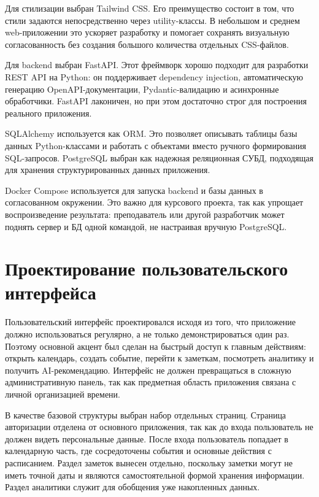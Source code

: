 \documentclass[14pt,a4paper]{extreport}
\begin{document}
Для стилизации выбран Tailwind CSS. Его преимущество состоит в том, что стили задаются непосредственно через utility-классы. В небольшом и среднем web-приложении это ускоряет разработку и помогает сохранять визуальную согласованность без создания большого количества отдельных CSS-файлов.

Для backend выбран FastAPI. Этот фреймворк хорошо подходит для разработки REST API на Python: он поддерживает dependency injection, автоматическую генерацию OpenAPI-документации, Pydantic-валидацию и асинхронные обработчики. FastAPI лаконичен, но при этом достаточно строг для построения реального приложения.

SQLAlchemy используется как ORM. Это позволяет описывать таблицы базы данных Python-классами и работать с объектами вместо ручного формирования SQL-запросов. PostgreSQL выбран как надежная реляционная СУБД, подходящая для хранения структурированных данных приложения.

Docker Compose используется для запуска backend и базы данных в согласованном окружении. Это важно для курсового проекта, так как упрощает воспроизведение результата: преподаватель или другой разработчик может поднять сервер и БД одной командой, не настраивая вручную PostgreSQL.

\section{Проектирование пользовательского интерфейса}

Пользовательский интерфейс проектировался исходя из того, что приложение должно использоваться регулярно, а не только демонстрироваться один раз. Поэтому основной акцент был сделан на быстрый доступ к главным действиям: открыть календарь, создать событие, перейти к заметкам, посмотреть аналитику и получить AI-рекомендацию. Интерфейс не должен превращаться в сложную административную панель, так как предметная область приложения связана с личной организацией времени.

В качестве базовой структуры выбран набор отдельных страниц. Страница авторизации отделена от основного приложения, так как до входа пользователь не должен видеть персональные данные. После входа пользователь попадает в календарную часть, где сосредоточены события и основные действия с расписанием. Раздел заметок вынесен отдельно, поскольку заметки могут не иметь точной даты и являются самостоятельной формой хранения информации. Раздел аналитики служит для обобщения уже накопленных данных.
\end{document}
